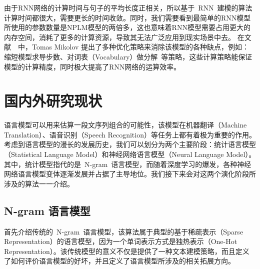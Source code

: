 由于RNN网络的计算时间与句子的平均长度正相关，所以基于~RNN~建模的算法计算时间都很大，需要更长的时间收敛。同时，我们需要看到最简单的RNN模型所使用的参数数量是NPLM模型的两倍多，这也意味着RNN模型需要占用更大的内存空间，消耗了更多的计算资源，导致其无法广泛应用到现实场景中去。
在文献~\cite{DBLP:conf/icassp/MikolovKBCK11}~中，Tomas Mikolov 提出了多种优化策略来消除该模型的各种缺点，例如：缩短模型求导步数、对词表（Vocabulary）做分解~等策略，这些计算策略能保证模型的计算精度，同时极大提高了RNN网络的运算效率。

\section{国内外研究现状}
语言模型可以用来估算一段文序列组合的可能性，该模型在机器翻译（Machine Translation）、语音识别（Speech Recognition）等任务上都有着极为重要的作用。考虑到语言模型的漫长的发展历史，我们可以划分为两个主要阶段：统计语言模型（Statistical Language Model）和神经网络语言模型（Neural Language Model）。
其中，统计模型指代的是~N-gram~语言模型，而随着深度学习的爆发，各种神经网络语言模型变体逐渐发展并占据了主导地位。我们接下来会对这两个演化阶段所涉及的算法一一介绍。

\subsection{N-gram 语言模型}
首先介绍传统的~N-gram~语言模型，该算法属于典型的基于稀疏表示（Sparse Representation）的语言模型，因为一个单词表示方式是独热表示（One-Hot Representation）。该传统模型的意义不仅是提供了一种文本建模策略，而且定义了如何评价语言模型的好坏，并且定义了语言模型所涉及的相关拓展方向。

